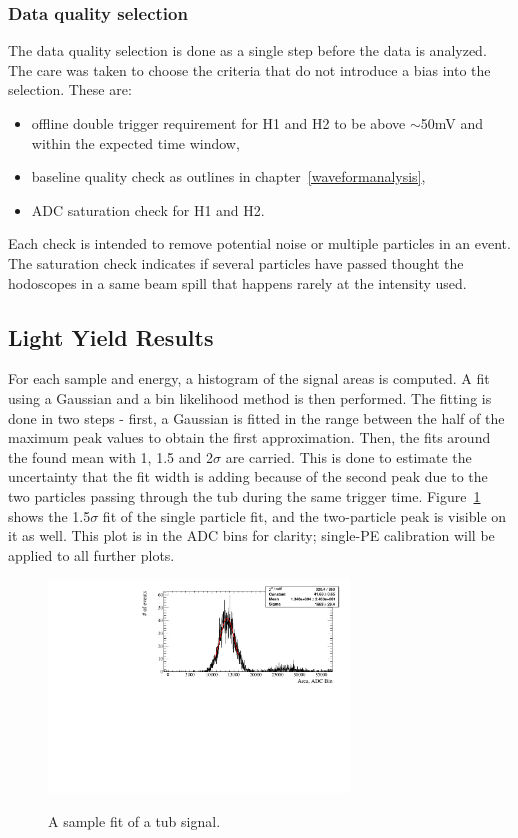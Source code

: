 \documentclass[preprint,12pt]{elsarticle}
\begin{document}
\subsubsection{Data quality selection}

The data quality selection is done as a single step before the data is analyzed. The care was taken to choose the criteria that do not introduce a bias into the selection. These are:

\begin{itemize}
	\item offline double trigger requirement for H1 and H2 to be above $\sim$50mV and within the expected time window,
	\item baseline quality check as outlines in chapter~\ref{waveformanalysis},
	\item ADC saturation check for H1 and H2.
\end{itemize}

Each check is intended to remove potential noise or multiple particles in an event. The saturation check indicates if several particles have passed thought the hodoscopes in a same beam spill that happens rarely at the intensity used.


\subsection{Light Yield Results}

For each sample and energy, a histogram of the signal areas is computed. A fit using a Gaussian and a bin likelihood method is then performed. The fitting is done in two steps - first, a Gaussian is fitted in the range between the half of the maximum peak values to obtain the first approximation. Then, the fits around the found mean with 1, 1.5 and 2$\sigma$ are carried. This is done to estimate the uncertainty that the fit width is adding because of the second peak due to the two particles passing through the tub during the same trigger time. Figure~\ref{fig:sampletubsignalfit} shows the 1.5$\sigma$ fit of the single particle fit, and the two-particle peak is visible on it as well. This plot is in the ADC bins for clarity; single-PE calibration will be applied to all further plots.

\begin{figure}[ht]
	\centering
		\includegraphics[width=80mm]{sampletubsignalfit.pdf}
	\label{fig:sampletubsignalfit}
	\caption{A sample fit of a tub signal.}
\end{figure}
\end{document}
